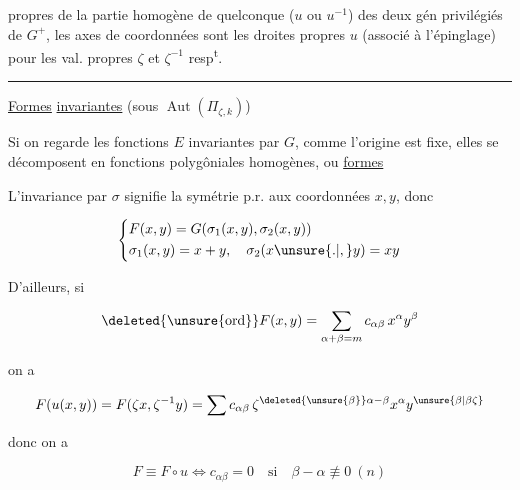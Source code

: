 
propres de la partie homogène de   quelconque ($u$ ou $u^{-1}$) des deux gén privilégiés de $G^+$, les axes de coordonnées sont les droites propres   $u$ (associé à l'épinglage) pour les val. propres $\zeta$ et $\zeta^{-1}$ resp\textsuperscript{t}.

\begin{center}\rule{1.5cm}{0.4pt}\end{center}

\uline{Formes}  \uline{invariantes} (sous $\operatorname{Aut}(\Pi_{\zeta,k})$)

Si on regarde les fonctions    $E$ invariantes par $G$, comme l'origine est fixe, elles se décomposent en fonctions polygôniales homogènes,  ou \uline{formes}

L'invariance par $\sigma$ signifie la symétrie p.r. aux  coordonnées $x,y$, donc

\[\left\{\begin{aligned}
&F(x,y)=G(\sigma_1(x,y),\sigma_2(x,y))\\
&\sigma_1(x,y)=x+y,\quad \sigma_2(x\unsure{.|,}y)=xy
\end{aligned}\right.\]

D'ailleurs, si \unsure{;|,|{}}

\[\deleted{\unsure{\operatorname{ord}}}F(x,y)=\sum_{\alpha+\beta=m}c_{\alpha\beta}\,x^\alpha y^\beta\]

on a

\[F(u(x,y))=F(\zeta x,\zeta^{-1}y)=\sum c_{\alpha\beta}\,\zeta^{\deleted{\unsure{\beta}}\alpha-\beta}x^\alpha y^{\unsure{\beta|\beta\zeta}}\]

donc on a

\[F\equiv F\circ u\Longleftrightarrow c_{\alpha\beta}=0\quad\text{si}\quad\beta-\alpha\not\equiv0\ (n)\]

